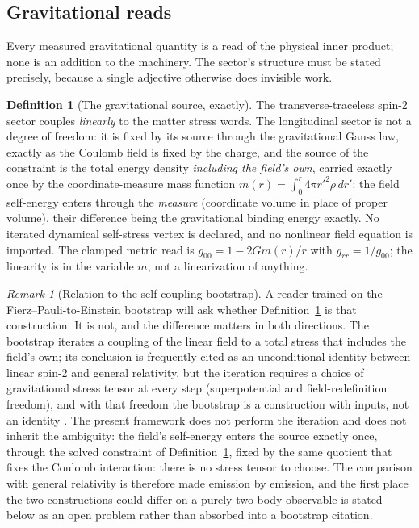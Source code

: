 \documentclass[11pt]{article}
\theoremstyle{definition}
\newtheorem{definition}[theorem]{Definition}
\theoremstyle{remark}
\newtheorem{remark}[theorem]{Remark}
\begin{document}
\subsection{Gravitational reads}\label{sec:gravreads}
Every measured gravitational quantity is a read of the physical inner
product; none is an addition to the machinery.  The sector's structure
must be stated precisely, because a single adjective otherwise does
invisible work.

\begin{definition}[The gravitational source, exactly]
\label{def:gravsource}
The transverse-traceless spin-2 sector couples \emph{linearly} to the
matter stress words.  The longitudinal sector is not a degree of
freedom: it is fixed by its source through the gravitational Gauss law,
exactly as the Coulomb field is fixed by the charge, and the source of
the constraint is the total energy density \emph{including the field's
own}, carried exactly once by the coordinate-measure mass function
$m(r) = \int_0^r 4\pi r'^2 \rho\, dr'$: the field self-energy enters
through the \emph{measure} (coordinate volume in place of proper
volume), their difference being the gravitational binding energy
exactly.  No iterated dynamical self-stress vertex is declared, and no
nonlinear field equation is imported.  The clamped metric read is
$g_{00} = 1 - 2Gm(r)/r$ with $g_{rr} = 1/g_{00}$; the linearity is in
the variable $m$, not a linearization of anything.
\end{definition}

\begin{remark}[Relation to the self-coupling bootstrap]\label{rem:deser}
A reader trained on the Fierz--Pauli-to-Einstein bootstrap
\cite{feynmangrav,deser1970} will ask whether
Definition~\ref{def:gravsource} is that construction.  It is not, and
the difference matters in both directions.  The bootstrap iterates a
coupling of the linear field to a total stress that includes the
field's own; its conclusion is frequently cited as an unconditional
identity between linear spin-2 and general relativity, but the
iteration requires a choice of gravitational stress tensor at every
step (superpotential and field-redefinition freedom), and with that
freedom the bootstrap is a construction with inputs, not an identity
\cite{padmanabhan,deser2010}.  The present framework does not perform
the iteration and does not inherit the ambiguity: the field's
self-energy enters the source exactly once, through the solved
constraint of Definition~\ref{def:gravsource}, fixed by the same
quotient that fixes the Coulomb interaction: there is no stress
tensor to choose.  The comparison with general relativity is therefore
made emission by emission, and the first place the two constructions
could differ on a purely two-body observable is stated below as an open
problem rather than absorbed into a bootstrap citation.
\end{remark}
\end{document}
